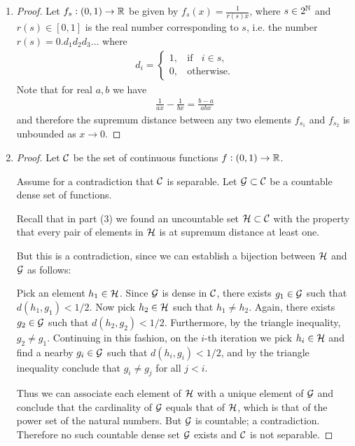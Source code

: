 \begin{enumerate}
\item
  \begin{proof}
    Let $f_s: (0, 1) \to \mathbb{R}$ be given by $f_s(x) = \frac{1}{r(s)x}$, where $s \in 2^{\mathbb{N}}$ and $r(s) \in [0, 1]$ is
    the real number corresponding to $s$, i.e. the number $r(s) = 0.d_1d_2d_3\ldots$ where
    \begin{align*}
      d_i =
      \begin{cases}
        1, ~~~~ \text{if} ~~~~ i \in s,\\
        0, ~~~~ \text{otherwise}.
      \end{cases}
    \end{align*}
    Note that for real $a, b$ we have
    \begin{align*}
      \frac{1}{ax} - \frac{1}{bx} = \frac{b - a}{abx}
    \end{align*}
    and therefore the supremum distance between any two elements $f_{s_1}$ and $f_{s_2}$ is unbounded
    as $x \to 0$.
  \end{proof}
\item
  \begin{proof}
    Let $\mathcal C$ be the set of continuous functions $f: (0, 1) \to \mathbb{R}$.

    Assume for a contradiction that $\mathcal C$ is separable. Let $\mathcal G \subset \mathcal C$ be a countable dense set of
    functions.

    Recall that in part (3) we found an uncountable set $\mathcal H \subset \mathcal C$ with the property that every pair
    of elements in $\mathcal H$ is at supremum distance at least one.

    But this is a contradiction, since we can establish a bijection between $\mathcal H$ and $\mathcal G$ as follows:

    Pick an element $h_1 \in \mathcal H$. Since $\mathcal G$ is dense in $\mathcal C$, there exists $g_1 \in \mathcal G$ such
    that $d(h_1, g_1) < 1/2$. Now pick $h_2 \in \mathcal H$ such that $h_1 \neq h_2$. Again, there
    exists $g_2 \in \mathcal G$ such that $d(h_2, g_2) < 1/2$. Furthermore, by the triangle
    inequality, $g_2 \neq g_1$. Continuing in this fashion, on the $i$-th iteration we pick $h_i \in \mathcal H$ and
    find a nearby $g_i \in \mathcal G$ such that $d(h_i, g_i) < 1/2$, and by the triangle inequality conclude
    that $g_i \neq g_j$ for all $j < i$.

    Thus we can associate each element of $\mathcal H$ with a unique element of $\mathcal G$ and conclude that the
    cardinality of $\mathcal G$ equals that of $\mathcal H$, which is that of the power set of the natural numbers.
    But $\mathcal G$ is countable; a contradiction. Therefore no such countable dense set $\mathcal G$ exists and $\mathcal C$
    is not separable.
  \end{proof}



\end{enumerate}
